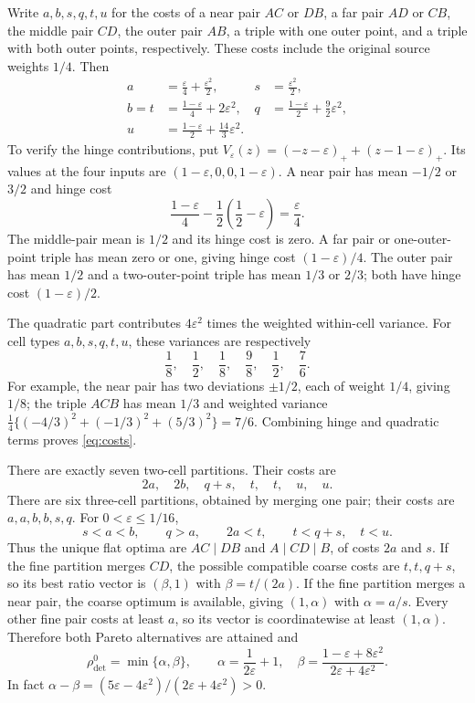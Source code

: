\documentclass[11pt]{article}
\theoremstyle{definition}\newtheorem{definition}[theorem]{Definition}
\theoremstyle{remark}\newtheorem{remark}[theorem]{Remark}
\newcommand{\detp}{\mathrm{det}}
\begin{document}
Write $a,b,s,q,t,u$ for the costs of a near pair $AC$ or $DB$, a far pair $AD$ or $CB$, the middle pair $CD$, the outer pair $AB$, a triple with one outer point, and a triple with both outer points, respectively. These costs include the original source weights $1/4$. Then
\begin{align}
a&=\frac\varepsilon4+\frac{\varepsilon^2}2,
&s&=\frac{\varepsilon^2}2,\label{eq:costs}\\
b=t&=\frac{1-\varepsilon}4+2\varepsilon^2,
&q&=\frac{1-\varepsilon}2+\frac92\varepsilon^2,\nonumber\\
u&=\frac{1-\varepsilon}2+\frac{14}3\varepsilon^2.&&\nonumber
\end{align}
To verify the hinge contributions, put $V_\varepsilon(z)=(-z-\varepsilon)_++(z-1-\varepsilon)_+$. Its values at the four inputs are $(1-\varepsilon,0,0,1-\varepsilon)$. A near pair has mean $-1/2$ or $3/2$ and hinge cost
\[
\frac{1-\varepsilon}4-\frac12\left(\frac12-\varepsilon\right)=\frac\varepsilon4.
\]
The middle-pair mean is $1/2$ and its hinge cost is zero. A far pair or one-outer-point triple has mean zero or one, giving hinge cost $(1-\varepsilon)/4$. The outer pair has mean $1/2$ and a two-outer-point triple has mean $1/3$ or $2/3$; both have hinge cost $(1-\varepsilon)/2$.

The quadratic part contributes $4\varepsilon^2$ times the weighted within-cell variance. For cell types $a,b,s,q,t,u$, these variances are respectively
\[
\frac18,\quad\frac12,\quad\frac18,\quad\frac98,\quad\frac12,\quad\frac76.
\]
For example, the near pair has two deviations $\pm1/2$, each of weight $1/4$, giving $1/8$; the triple $ACB$ has mean $1/3$ and weighted variance
$\tfrac14\{(-4/3)^2+(-1/3)^2+(5/3)^2\}=7/6$.
Combining hinge and quadratic terms proves \eqref{eq:costs}.

There are exactly seven two-cell partitions. Their costs are
\[
2a,\quad2b,\quad q+s,\quad t,\quad t,\quad u,\quad u.
\]
There are six three-cell partitions, obtained by merging one pair; their costs are $a,a,b,b,s,q$. For $0<\varepsilon\le1/16$,
\[
s<a<b,\qquad q>a,\qquad2a<t,\qquad t<q+s,\quad t<u.
\]
Thus the unique flat optima are $AC\mid DB$ and $A\mid CD\mid B$, of costs $2a$ and $s$. If the fine partition merges $CD$, the possible compatible coarse costs are $t,t,q+s$, so its best ratio vector is $(\beta,1)$ with $\beta=t/(2a)$. If the fine partition merges a near pair, the coarse optimum is available, giving $(1,\alpha)$ with $\alpha=a/s$. Every other fine pair costs at least $a$, so its vector is coordinatewise at least $(1,\alpha)$. Therefore both Pareto alternatives are attained and
\begin{equation}
\rho_{\detp}^0=\min\{\alpha,\beta\},\qquad
\alpha=\frac1{2\varepsilon}+1,\quad
\beta=\frac{1-\varepsilon+8\varepsilon^2}{2\varepsilon+4\varepsilon^2}.
\label{eq:paretoideal}
\end{equation}
In fact $\alpha-\beta=(5\varepsilon-4\varepsilon^2)/(2\varepsilon+4\varepsilon^2)>0$.
\end{document}
